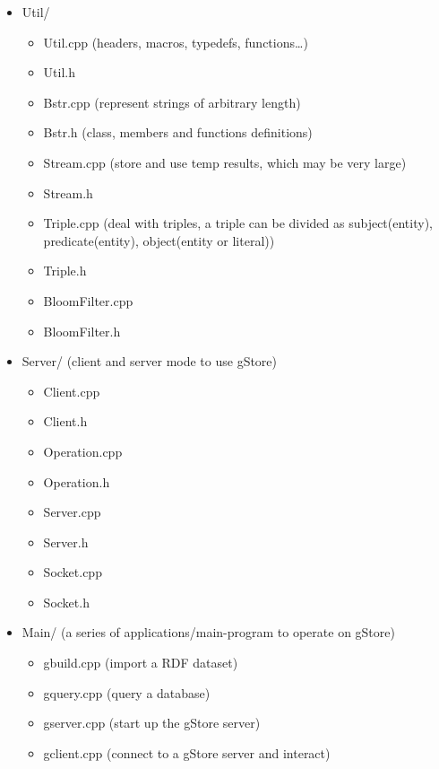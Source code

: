 \documentclass[titlepage, a4paper, 12pt]{article}
\begin{document}
\begin{itemize}
\item
  Util/

  \begin{itemize}
  \item
    Util.cpp (headers, macros, typedefs, functions\ldots{})
  \item
    Util.h
  \item
    Bstr.cpp (represent strings of arbitrary length)
  \item
    Bstr.h (class, members and functions definitions)
  \item
    Stream.cpp (store and use temp results, which may be very large)
  \item
    Stream.h
  \item
    Triple.cpp (deal with triples, a triple can be divided as
    subject(entity), predicate(entity), object(entity or literal))
  \item
    Triple.h
  \item
    BloomFilter.cpp
  \item
    BloomFilter.h
  \end{itemize}
\end{itemize}


\begin{itemize}
\item
  Server/ (client and server mode to use gStore)

  \begin{itemize}
  \item
    Client.cpp
  \item
    Client.h
  \item
    Operation.cpp
  \item
    Operation.h
  \item
    Server.cpp
  \item
    Server.h
  \item
    Socket.cpp
  \item
    Socket.h
  \end{itemize}
\item
  Main/ (a series of applications/main-program to operate on gStore)

  \begin{itemize}
  \item
    gbuild.cpp (import a RDF dataset)
  \item
    gquery.cpp (query a database)
  \item
    gserver.cpp (start up the gStore server)
  \item
    gclient.cpp (connect to a gStore server and interact)
  \end{itemize}
\end{itemize}
\end{document}
